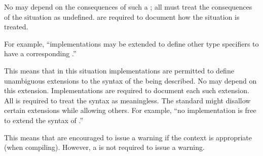 No  may depend on the consequences of such a ;
all  must treat the consequences of the situation
as undefined.  are required to document how the
situation is treated.

For example, ``implementations may be extended to define other type
specifiers to have a corresponding .''

%

This means that in this situation implementations are permitted to
define unambiguous extensions to the syntax of the  being
described.  No  may depend on this extension.
Implementations are required to document each such extension. All
 is required to treat the syntax as meaningless. The
standard might disallow certain extensions while allowing others. For
example, ``no implementation is free to extend the syntax of
.''
                          
%
         
This means that  are encouraged to issue a warning
if the context is appropriate (\eg when compiling).  However, a
 is not required to issue a warning.

%                        
% 

